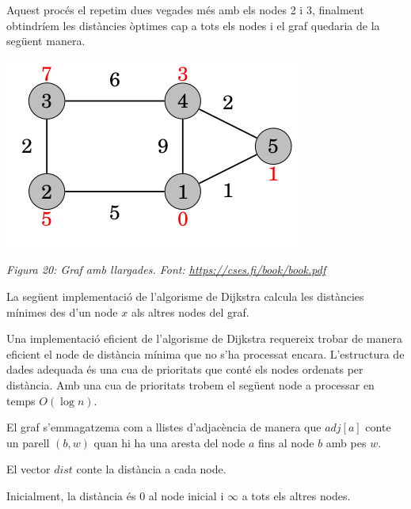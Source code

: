 Aquest procés el repetim dues vegades més amb els nodes 2 i 3, finalment obtindríem les distàncies òptimes cap a tots els nodes i el graf quedaria de la següent manera.

\begin{center}
    \includegraphics[width=.5 \textwidth]{grafDij5.png}
    
    \caption{\emph{Figura 20: Graf amb llargades. Font: \url{https://cses.fi/book/book.pdf}}}
\end{center}

La següent implementació de l'algorisme de Dijkstra calcula les distàncies mínimes des d'un node $x$ als altres nodes del graf.

Una implementació eficient de l'algorisme de Dijkstra requereix trobar de manera eficient el node de distància mínima que no s'ha processat encara. L'estructura de dades adequada és una cua de prioritats que conté els nodes ordenats per distància. Amb una cua de prioritats trobem el següent node a processar en temps $O(\log n)$.

El graf s'emmagatzema com a llistes d'adjacència de manera que $adj[a]$ conte un parell $(b, w)$ quan hi ha una aresta del node $a$ fins al node $b$ amb pes $w$.

El vector $dist$ conte la distància a cada node.

Inicialment, la distància és 0 al node inicial i $\infty$ a tots els altres nodes.

